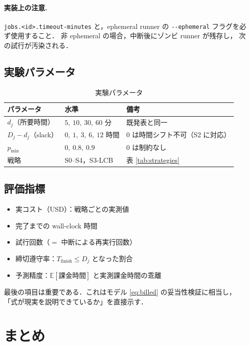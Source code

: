 \documentclass[11pt,a4paper]{ltjsarticle}
\newcommand{\Tfin}{T_{\mathrm{finish}}}
\newcommand{\E}{\mathbb{E}}
\begin{document}
\paragraph{実装上の注意.}
\verb|jobs.<id>.timeout-minutes| と，ephemeral runner の
\verb|--ephemeral| フラグを必ず使用すること．
非 ephemeral の場合，中断後にゾンビ runner が残存し，
次の試行が汚染される．

\subsection{実験パラメータ}

\begin{table}[htbp]
\centering
\caption{実験パラメータ}
\label{tab:params}
\begin{tabularx}{\textwidth}{@{}llX@{}}
\toprule
パラメータ & 水準 & 備考 \\
\midrule
$d_j$（所要時間）   & $5,\ 10,\ 30,\ 60$ 分 & 既発表と同一 \\
$D_j - d_j$（slack）& $0,\ 1,\ 3,\ 6,\ 12$ 時間 & $0$ は時間シフト不可（S2 に対応）\\
$p_{\min}$          & $0,\ 0.8,\ 0.9$ & $0$ は制約なし \\
戦略                & S0--S4，S3-LCB & 表 \ref{tab:strategies} \\
\bottomrule
\end{tabularx}
\end{table}

\subsection{評価指標}

\begin{itemize}
  \item 実コスト（USD）：戦略ごとの実測値
  \item 完了までの wall-clock 時間
  \item 試行回数（$=$ 中断による再実行回数）
  \item 締切遵守率：$\Tfin \le D_j$ となった割合
  \item 予測精度：$\E[\text{課金時間}]$ と実測課金時間の乖離
\end{itemize}

最後の項目は重要である．これはモデル \eqref{eq:billed} の妥当性検証に相当し，
「式が現実を説明できているか」を直接示す．

\section{まとめ}
\end{document}
